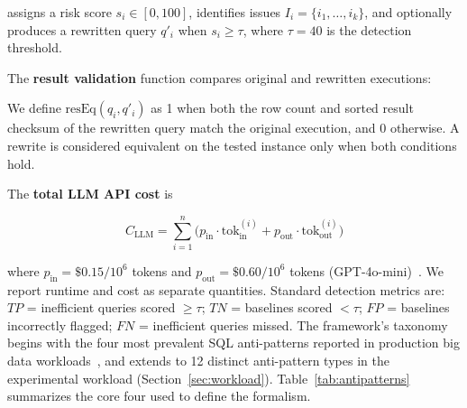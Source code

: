 \documentclass[conference]{IEEEtran}
\begin{document}
assigns a risk score $s_i \in [0, 100]$, identifies issues $I_i = \{i_1, \ldots, i_k\}$, and optionally produces a rewritten query $q'_i$ when $s_i \geq \tau$, where $\tau = 40$ is the detection threshold.

The \textbf{result validation} function compares original and rewritten executions:

We define $\text{resEq}(q_i, q'_i)$ as 1 when both the row count and sorted result checksum of the rewritten query match the original execution, and 0 otherwise. A rewrite is considered equivalent on the tested instance only when both conditions hold.

The \textbf{total LLM API cost} is

\begin{equation}
C_{\text{LLM}} = \sum_{i=1}^{n} \big( p_{\text{in}} \cdot \text{tok}_{\text{in}}^{(i)} + p_{\text{out}} \cdot \text{tok}_{\text{out}}^{(i)} \big)
\label{eq:cost}
\end{equation}

where $p_{\text{in}} = \$0.15/10^6$ tokens and
$p_{\text{out}} = \$0.60/10^6$ tokens (GPT-4o-mini)~\cite{openai2026models}.
We report runtime and cost as separate quantities.
Standard detection metrics are: $TP$ = inefficient queries scored $\geq \tau$;
$TN$ = baselines scored $< \tau$; $FP$ = baselines incorrectly flagged;
$FN$ = inefficient queries missed.
The framework's taxonomy begins with the four most prevalent SQL anti-patterns reported in production big data workloads~\cite{bress2025snowflake,gcpantipattern}, and extends to 12 distinct anti-pattern types in the experimental workload (Section~\ref{sec:workload}). Table~\ref{tab:antipatterns} summarizes the core four used to define the formalism.

\begin{table}[t]
\caption{Target Anti-pattern Taxonomy}
\label{tab:antipatterns}
\centering
\small
{}
\end{table}
\end{document}
